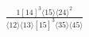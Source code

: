 \documentclass[varwidth, border=5pt]{standalone}
\begin{document}
\begin{my}
$\begin{gathered}
\scriptscriptstyle\frac{1[14]^3⟨15⟩⟨24⟩^2}{⟨12⟩⟨13⟩[15]^3⟨35⟩⟨45⟩}
\end{gathered}$
\end{my}
\end{document}
